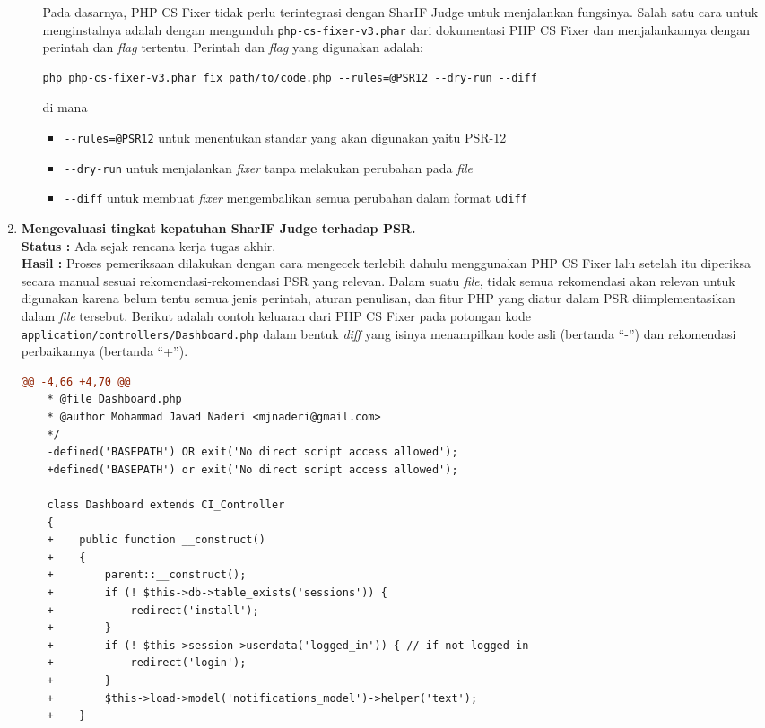 \documentclass[a4paper,twoside]{article}
\begin{document}
\begin{enumerate}
\begin{enumerate}
			Pada dasarnya, PHP CS Fixer tidak perlu terintegrasi dengan SharIF Judge untuk menjalankan fungsinya. Salah satu cara untuk menginstalnya adalah dengan mengunduh \verb|php-cs-fixer-v3.phar| dari dokumentasi PHP CS Fixer dan menjalankannya dengan perintah dan \textit{flag} tertentu. Perintah dan \textit{flag} yang digunakan adalah:
			\begin{lstlisting}[basicstyle=\ttfamily, frame=single,
				columns=fullflexible, keepspaces=true, breaklines=true, label=ls:1]
				php php-cs-fixer-v3.phar fix path/to/code.php --rules=@PSR12 --dry-run --diff
			\end{lstlisting}
			di mana
			\begin{itemize}
				\item \verb|--rules=@PSR12| untuk menentukan standar yang akan digunakan yaitu PSR-12
				\item \verb|--dry-run| untuk menjalankan \textit{fixer} tanpa melakukan perubahan pada \textit{file}
				\item \verb|--diff| untuk membuat \textit{fixer} mengembalikan semua perubahan dalam format \verb|udiff|
			\end{itemize}
		\end{enumerate}
		
		
		\item \textbf{Mengevaluasi tingkat kepatuhan SharIF Judge terhadap PSR.}\\
		{\bf Status :} Ada sejak rencana kerja tugas akhir.\\
		{\bf Hasil :} Proses pemeriksaan dilakukan dengan cara mengecek terlebih dahulu menggunakan PHP CS Fixer lalu setelah itu diperiksa secara manual sesuai rekomendasi-rekomendasi PSR yang relevan. Dalam suatu \textit{file}, tidak semua rekomendasi akan relevan untuk digunakan karena belum tentu semua jenis perintah, aturan penulisan, dan fitur PHP yang diatur dalam PSR diimplementasikan dalam \textit{file} tersebut. Berikut adalah contoh keluaran dari PHP CS Fixer pada potongan kode \verb|application/controllers/Dashboard.php| dalam bentuk \textit{diff} yang isinya menampilkan kode asli (bertanda ``-'') dan rekomendasi perbaikannya (bertanda ``+''). 
\begin{lstlisting}[frame=single,language=diff]  
	@@ -4,66 +4,70 @@
	* @file Dashboard.php
	* @author Mohammad Javad Naderi <mjnaderi@gmail.com>
	*/
	-defined('BASEPATH') OR exit('No direct script access allowed');
	+defined('BASEPATH') or exit('No direct script access allowed');
	
	class Dashboard extends CI_Controller
	{
	+    public function __construct()
	+    {
	+        parent::__construct();
	+        if (! $this->db->table_exists('sessions')) {
	+            redirect('install');
	+        }
	+        if (! $this->session->userdata('logged_in')) { // if not logged in
	+            redirect('login');
	+        }
	+        $this->load->model('notifications_model')->helper('text');
	+    }
		

\end{lstlisting}
\end{enumerate}
\end{document}
